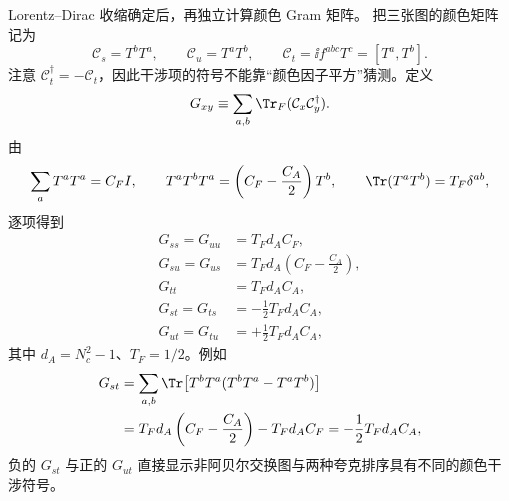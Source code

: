 \begin{derivation}[夸克与胶子散射的通道求和]
Lorentz--Dirac 收缩确定后，再独立计算颜色 Gram 矩阵。
把三张图的颜色矩阵记为
\begin{equation*}
 \mathcal C_s=T^bT^a,
 \qquad
 \mathcal C_u=T^aT^b,
 \qquad
 \mathcal C_t=\ii f^{abc}T^c=[T^a,T^b].
\end{equation*}
注意 $\mathcal C_t^\dagger=-\mathcal C_t$，因此干涉项的符号不能靠“颜色因子平方”猜测。定义
\begin{equation*}
 G_{xy}\equiv\sum_{a,b}\Tr_F(\mathcal C_x\mathcal C_y^\dagger).
\end{equation*}
由
\begin{equation*}
 \sum_aT^aT^a=C_FI,
 \qquad
 T^aT^bT^a=\left(C_F-\frac{C_A}{2}\right)T^b,
 \qquad
 \Tr(T^aT^b)=T_F\delta^{ab},
\end{equation*}
逐项得到
\begin{align*}
 G_{ss}=G_{uu}&=T_Fd_AC_F,\\
 G_{su}=G_{us}&=T_Fd_A\left(C_F-\frac{C_A}{2}\right),\\
 G_{tt}&=T_Fd_AC_A,\\
 G_{st}=G_{ts}&=-\frac12T_Fd_AC_A,\\
 G_{ut}=G_{tu}&=+\frac12T_Fd_AC_A,
\end{align*}
其中 $d_A=N_c^2-1$、$T_F=1/2$。例如
\begin{align*}
 G_{st}
 &=\sum_{a,b}\Tr\!\left[T^bT^a(T^bT^a-T^aT^b)\right]\\
 &=T_Fd_A\left(C_F-\frac{C_A}{2}\right)-T_Fd_AC_F
 =-\frac12T_Fd_AC_A,
\end{align*}
负的 $G_{st}$ 与正的 $G_{ut}$ 直接显示非阿贝尔交换图与两种夸克排序具有不同的颜色干涉符号。


\end{derivation}
